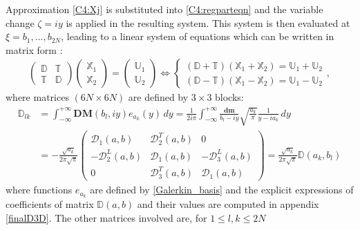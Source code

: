 Approximation \eqref{C4:Xj} is substituted into \eqref{C4:regparteqn} and the variable change $\zeta=iy$ is applied in the resulting system. This system is then evaluated at $\xi=b_1,...,b_{2N}$, leading to a linear system of equations which can be written in matrix form :
\begin{eqnarray}
\begin{pmatrix}
\mathbb{D}&\mathbb{T}\\
\mathbb{T}&\mathbb{D}
\end{pmatrix}
\begin{pmatrix}
\mathbb{X}_1 \\
\mathbb{X}_2
\end{pmatrix}
=
\begin{pmatrix}
\mathbb{U}_1 \\
\mathbb{U}_2
\end{pmatrix}
\Leftrightarrow
\left\{
\begin{array}{l}
(\mathbb{D}+\mathbb{T})(\mathbb{X}_1+\mathbb{X}_2)= \mathbb{U}_1+\mathbb{U}_2 \\
(\mathbb{D}-\mathbb{T})(\mathbb{X}_1-\mathbb{X}_2)= \mathbb{U}_1-\mathbb{U}_2
\end{array}
	\right.,
\label{C4:systmat}
\end{eqnarray}
where matrices $(6N\times 6N)$ are defined by $3\times3$ blocks:
\begin{equation}
\begin{split}
\mathbb{D}_{lk}&=\int_{-\infty}^{+\infty} \textbf{DM}(b_l,iy)e_{a_k}(y) \, dy =\frac{1}{2i\pi} \int_{-\infty}^{+\infty} \frac{\mathbf{dm}}{b_l-iy} 
\sqrt{\frac{a_k}{\pi}}\frac{1}{y-ia_k} \, dy \\
&=- \frac{\sqrt{a_k}}{2\pi \sqrt{\pi}}
\begin{pmatrix}
\mathcal{D}_1(a,b) &\mathcal{D}_2^T(a,b) &0\\
-\mathcal{D}_2^L(a,b) &\mathcal{D}_1(a,b)&-\mathcal{D}_3^L(a,b)\\
0&\mathcal{D}_3^T(a,b)&\mathcal{D}_1(a,b)
\end{pmatrix}=\frac{\sqrt{a_k}}{2\pi \sqrt{\pi}}\mathbb{D}(a_k,b_l)
\end{split}
\label{C4:Dab}
\end{equation}
where functions $e_{a_k}$ are defined by \eqref{Galerkin_basis} and the explicit expressions of coefficients of matrix $\mathbb{D}(a,b)$ and their values are computed in appendix \ref{finalD3D}. The other matrices involved are, for $1\leq l,k \leq 2N$
